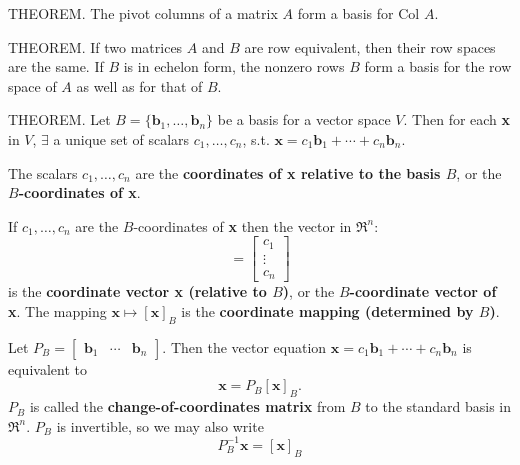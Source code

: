 \documentclass{article}
\begin{document}
\hfill \newline THEOREM. The pivot columns of a matrix $A$ form a basis for Col $A$.

\hfill \newline THEOREM. If two matrices $A$ and $B$ are row equivalent, then their row spaces are the same. If $B$ is in echelon form, the nonzero rows $B$ form a basis for the row space of $A$ as well as for that of $B$.

\hfill \newline THEOREM. Let $B = \{\textbf{b}_1,\dots,\textbf{b}_n\}$ be a basis for a vector space $V$. Then for each \textbf{x} in $V$, $\exists$ a unique set of scalars $c_1,\dots,c_n$, s.t. $\textbf{x} = c_1\textbf{b}_1+\cdots+c_n\textbf{b}_n$.

\hfill \newline The scalars $c_1,\dots,c_n$ are the \textbf{coordinates of x relative to the basis $B$}, or the \textbf{$B$-coordinates of x}. 

\hfill \newline If $c_1,\dots,c_n$ are the $B$-coordinates of \textbf{x} then the vector in $\Re^n$: 
\begin{equation}
    [\textbf{x}_B] = 
    \begin{bmatrix}
    c_1 \\
    \vdots \\
    c_n
    \end{bmatrix}
\end{equation}
\noindent is the \textbf{coordinate vector x (relative to $B$)}, or the \textbf{$B$-coordinate vector of x}. The mapping $\textbf{x} \mapsto [\textbf{x}]_B$ is the \textbf{coordinate mapping (determined by $B$)}. 

\hfill \newline Let $P_B = 
\begin{bmatrix}
    \textbf{b}_1 & \cdots & \textbf{b}_n
\end{bmatrix}.$
Then the vector equation $\textbf{x} = c_1\textbf{b}_1 + \cdots + c_n\textbf{b}_n$ is equivalent to 
\begin{equation}
    \textbf{x} = P_B[\textbf{x}]_B.
\end{equation}
\noindent $P_B$ is called the \textbf{change-of-coordinates matrix} from $B$ to the standard basis in $\Re^n$. $P_B$ is invertible, so we may also write 
\begin{equation}
    P_B^{-1}\textbf{x} = [\textbf{x}]_B
\end{equation}
\end{document}
